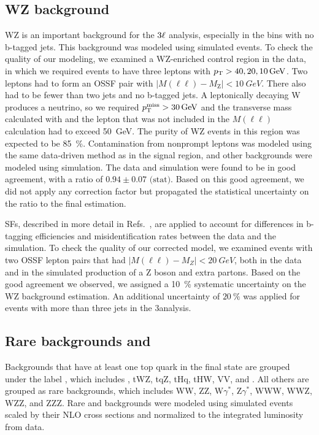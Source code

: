 \subsection{WZ background}
WZ is an important background for the $3{\ell}$ \ttZ analysis, especially in the bins with no b-tagged
jets. This background was modeled using simulated events. To check the quality of our modeling, we
examined a WZ-enriched control region in the data, in which we required events to have three leptons
with $p_\text{T}> 40, 20, \SI{10}{GeV}$. Two leptons had to form an OSSF pair with $|M(\ell\ell) -
M_\text{Z}| < \SI{10}{GeV}$. There also had to be fewer than two jets and no b-tagged jets. A
leptonically decaying W produces a neutrino, so we required $p_\text{T}^\text{miss} > \SI{30}{GeV}$ and the
transverse mass calculated with \pTmiss and the lepton that was not included in the $M(\ell\ell)$
calculation had to exceed \SI{50}{GeV}. The purity of WZ events in this region was expected to be
\SI{85}{\percent}. Contamination from nonprompt leptons was modeled using the same data-driven
method as in the signal region, and other backgrounds were modeled using simulation. The data and
simulation were found to be in good agreement, with a ratio of $0.94 \pm 0.07\text{ (stat)}$. Based
on this good agreement, we did not apply any correction factor but propagated the statistical
uncertainty on the ratio to the final estimation.

SFs, described in more detail in Refs.~\cite{Chatrchyan:2012jua,CMS-PAS-BTV-15-001}, are applied to
account for differences in b-tagging efficiencies and misidentification rates between the data and
the simulation. To check the quality of our corrected model, we examined events with two OSSF lepton
pairs that had $|M(\ell\ell) - M_Z| < \SI{20}{GeV}$, both in the data and in the simulated
production of a Z boson and extra partons. Based on the good agreement we observed, we assigned a
\SI{10}{\percent} systematic uncertainty on the WZ background estimation. An additional uncertainty
of $\SI{20}{\percent}$ was applied for events with more than three jets in the 3\lep \ttZ analysis.

\subsection{Rare backgrounds and \ttX}
Backgrounds that have at least one top quark in the final state are grouped under the label \ttX,
which includes \ttH, tWZ, tqZ, tHq, tHW, {\ttbar}VV, and {\ttbar}\ttbar. All others are grouped as
rare backgrounds, which includes WW, ZZ, W$\gamma^*$, Z$\gamma^*$, WWW, WWZ, WZZ, and ZZZ. Rare and
\ttX backgrounds were modeled using simulated events scaled by their NLO cross sections and
normalized to the integrated luminosity from data.


